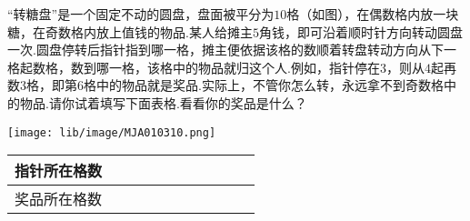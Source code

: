 “转糖盘”是一个固定不动的圆盘，盘面被平分为$10$格（如图），在偶数格内放一块糖，在奇数格内放上值钱的物品.某人给摊主$5$角钱，即可沿着顺时针方向转动圆盘一次.圆盘停转后指针指到哪一格，摊主便依据该格的数顺着转盘转动方向从下一格起数格，数到哪一格，该格中的物品就归这个人.例如，指针停在$3$，则从$4$起再数$3$格，即第$6$格中的物品就是奖品.实际上，不管你怎么转，永远拿不到奇数格中的物品.请你试着填写下面表格.看看你的奖品是什么？\\
\begin{center}
	\texttt{[image: lib/image/MJA010310.png]}
	\vspace{0.5cm}
\end{center}

\begin{tabular}{|l|l|l|l|l|l|l|l|l|l|l|}
	\hline
	指针所在格数 &  &  &  &  &  &  &  &  &  &  \\ \hline
	奖品所在格数 &  &  &  &  &  &  &  &  &  &  \\ \hline
\end{tabular}